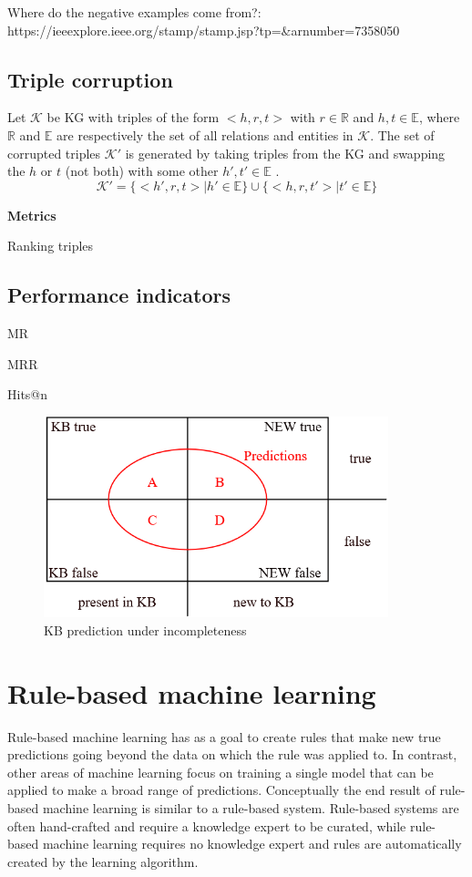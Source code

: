 Where do the negative examples come from?: https://ieeexplore.ieee.org/stamp/stamp.jsp?tp=&arnumber=7358050
\subsection{Triple corruption}
Let $\mathcal{K}$ be KG with triples of the form $<h, r, t>$ with $r\in \mathbb{R}$ and $h, t \in \mathbb{E}$, where $\mathbb{R}$ and $\mathbb{E}$ are respectively the set of all relations and entities in $\mathcal{K}$. The set of corrupted triples $\mathcal{K'}$ is generated by taking triples from the KG and swapping the $h$ or $t$ (not both) with some other $h', t' \in \mathbb{E}$ \cite{TransE}.
\begin{equation}
   \mathcal{K'} =\{<h', r, t> |h' \in \mathbb{E} \} \cup \{<h, r , t'> | t' \in \mathbb{E}\}
\end{equation}



\textbf{Metrics}

    Ranking triples
    
\subsection{Performance indicators}

    MR

    MRR

    Hits@n
    
    
\begin{figure}[htp]
    \centering
    \includegraphics[width=10cm]{figures/kb_venn.png}
    \caption{KB prediction under incompleteness}
\end{figure}


\section{Rule-based machine learning}
Rule-based machine learning has as a goal to create rules that make new true predictions going beyond the data on which the rule was applied to. In contrast, other areas of machine learning focus on training a single model that can be applied to make a broad range of predictions. Conceptually the end result of rule-based machine learning is similar to a rule-based system.  Rule-based systems are often hand-crafted and require a knowledge expert to be curated, while rule-based machine learning requires no knowledge expert and rules are automatically created by the learning algorithm.

